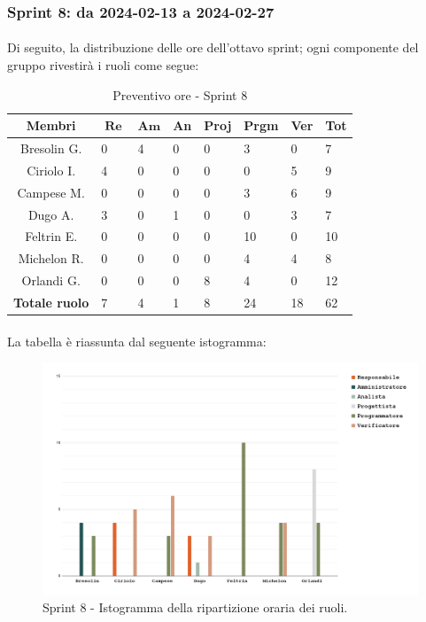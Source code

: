 \documentclass[10pt, a4paper]{article}
\begin{document}
{{{{{{{{{{{{{{{%
\subsubsection{Sprint 8: da 2024-02-13 a 2024-02-27}
\paragraph{}Di seguito, la distribuzione delle ore dell'ottavo sprint; ogni componente del gruppo rivestirà i ruoli come segue:
\begin{table}[H]
\begin{tabularx}{\textwidth}{c|X|X|X|X|X|X|X}
        \textbf{Membri} & $\operatorname{\textbf{Re}}$ & $\mathrm{\textbf{Am}}$ & \textbf{An} & \textbf{Proj} & \textbf{Prgm} & \textbf{Ver} & \textbf{Tot} \\
        \hline Bresolin G. & 0 & \cellcolor{primarycolor}4 & 0 & 0 & 3 & 0 & 7 \\
        \hline Ciriolo I.  & 4 & 0 & 0 & 0 & 0 & \cellcolor{primarycolor}5 & 9 \\
        \hline Campese M.  & 0 & 0 & 0 & 0 & 3 & \cellcolor{primarycolor}6 & 9 \\
        \hline Dugo A.     & \cellcolor{primarycolor}3 & 0 & 1 & 0 & 0 & 3 & 7 \\
        \hline Feltrin E.  & 0 & 0 & 0 & 0 & \cellcolor{primarycolor}10 & 0 & 10 \\
        \hline Michelon R. & 0 & 0 & 0 & 0 & \cellcolor{primarycolor}4 & 4 & 8 \\
        \hline Orlandi G.  & 0 & 0 & 0 & \cellcolor{primarycolor}8 & 4 & 0 & 12 \\
        \hline
        \textbf{Totale ruolo} & 7 & 4 & 1 & 8 & 24 & 18 & 62 
    \end{tabularx}
    \caption{Preventivo ore - Sprint 8}
    \end{table}

\paragraph{}La tabella è riassunta dal seguente istogramma:
 \begin{figure}[H]
        \centering        
        \includegraphics[width=15.5cm]{istogrammi/istogramma_8_periodo.png}
        \caption{Sprint 8 - Istogramma della ripartizione oraria dei ruoli. }
    \end{figure}


}}}}}}}}}}}}}}}
\end{document}
